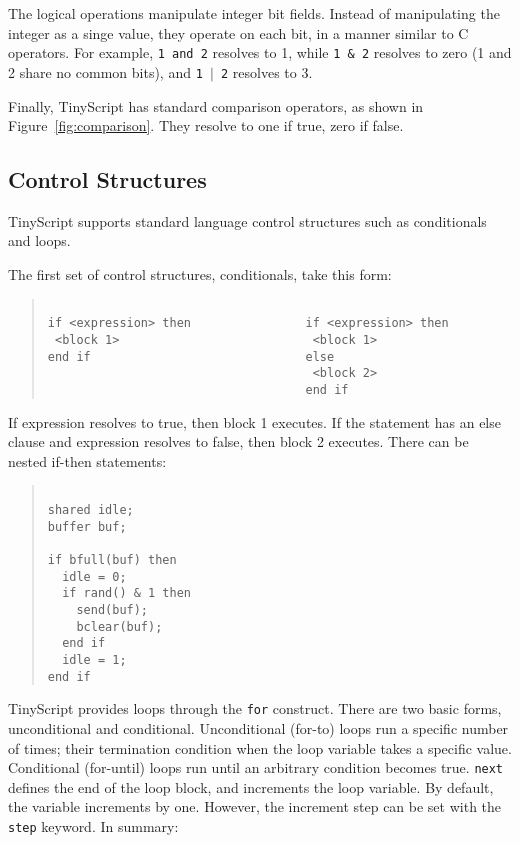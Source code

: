\documentclass[12pt]{article}
\begin{document}
The logical operations manipulate integer bit fields. Instead of
manipulating the integer as a singe value, they operate on each bit,
in a manner similar to C operators. For example, {\tt 1 and 2}
resolves to 1, while {\tt 1 \& 2} resolves to zero (1 and 2 share no
common bits), and {\tt 1 $\mid$ 2} resolves to 3.

Finally, TinyScript has standard comparison operators, as shown in
Figure~\ref{fig:comparison}. They resolve to one if true, zero if
false.

\subsection{Control Structures}

TinyScript supports standard language control structures such as
conditionals and loops.

The first set of control structures, conditionals, take this form:

\begin{quotation}
\begin{verbatim}

if <expression> then                if <expression> then
 <block 1>                           <block 1>
end if                              else 
                                     <block 2>
                                    end if
\end{verbatim}
\end{quotation}


If expression resolves to true, then block 1 executes. If the
statement has an else clause and expression resolves to false, then
block 2 executes. There can be nested if-then statements:

\begin{quotation}
\begin{verbatim}

shared idle;
buffer buf;

if bfull(buf) then
  idle = 0;
  if rand() & 1 then
    send(buf);
    bclear(buf);
  end if
  idle = 1;
end if
\end{verbatim}
\end{quotation}

TinyScript provides loops through the {\tt for} construct. There are
two basic forms, unconditional and conditional. Unconditional (for-to)
loops run a specific number of times; their termination condition when
the loop variable takes a specific value. Conditional (for-until)
loops run until an arbitrary condition becomes true. {\tt next}
defines the end of the loop block, and increments the loop
variable. By default, the variable increments by one. However, the
increment step can be set with the {\tt step} keyword. In summary:
\end{document}
